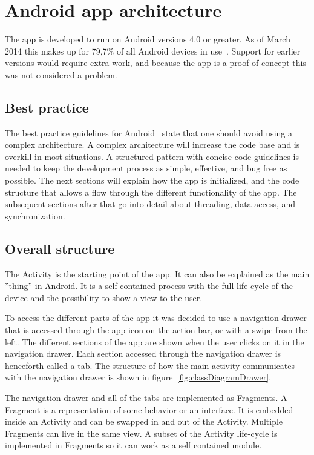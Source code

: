 \section{Android app architecture}
\label{sec:arch_app}
The app is developed to run on Android versions 4.0 or greater. As of March 2014 this makes up for 79,7\% of all Android devices in use~\cite{AndroidDeviceFragmentation}.
Support for earlier versions would require extra work, and because the app is a proof-of-concept this was not considered a problem.


\subsection{Best practice}
The best practice guidelines for Android~\cite{androidPracticePerformance} state that one should avoid using a complex architecture. A complex architecture will increase the code base and is overkill in most situations. A structured pattern with concise code guidelines is needed to keep the development process as simple, effective, and bug free as possible. The next sections will explain how the app is initialized, and the code structure that allows a flow through the different functionality of the app. The subsequent sections after that go into detail about threading, data access, and synchronization.

\subsection{Overall structure}
The Activity is the starting point of the app. It can also be explained as the main ''thing'' in Android. It is a self contained process with the full life-cycle of the device and the possibility to show a view to the user.

To access the different parts of the app it was decided to use a navigation drawer that is accessed through the app icon on the action bar, or with a swipe from the left. The different sections of the app are shown when the user clicks on it in the navigation drawer. Each section accessed through the navigation drawer is henceforth called a tab. The structure of how the main activity communicates with the navigation drawer is shown in figure~\ref{fig:classDiagramDrawer}.

The navigation drawer and all of the tabs are implemented as Fragments. A Fragment is a representation of some behavior or an interface. It is embedded inside an Activity and can be swapped in and out of the Activity. Multiple Fragments can live in the same view. A subset of the Activity life-cycle is implemented in Fragments so it can work as a self contained module. 

